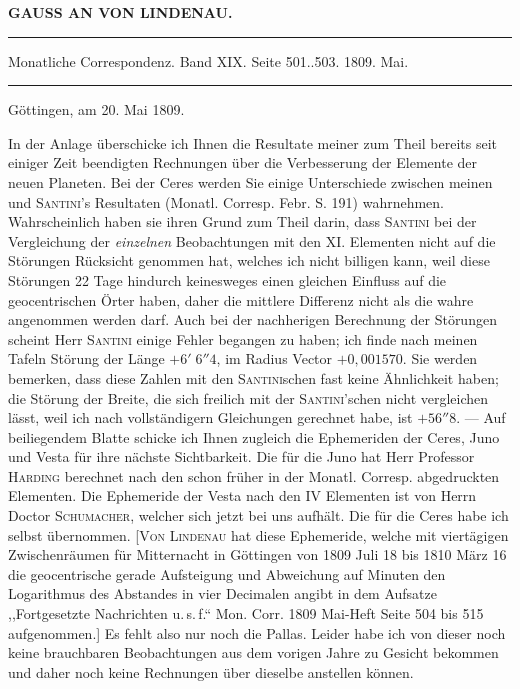 \clearpage
{}
\hypertarget{native-316-lower}{}
\begin{center}
\textbf{GAUSS AN VON LINDENAU.}

\par\vspace{4pt}\hrule\vspace{4pt}
\fontsize{10}{12}\selectfont Monatliche Correspondenz. Band XIX. Seite 501..503. 1809. Mai.
\par\vspace{4pt}\hrule\vspace{4pt}
\end{center}

\begin{flushright}Göttingen, am 20. Mai 1809.\end{flushright}

\par\indent In der Anlage überschicke ich Ihnen die Resultate meiner zum Theil bereits seit einiger Zeit beendigten Rechnungen über die Verbesserung der Elemente der neuen Planeten. Bei der Ceres werden Sie einige Unterschiede zwischen meinen und \textsc{Santini}'s Resultaten (Monatl. Corresp. Febr. S. 191) wahrnehmen. Wahrscheinlich haben sie ihren Grund zum Theil darin, dass \textsc{Santini} bei der Vergleichung der \emph{einzelnen} Beobachtungen mit den XI. Elementen nicht auf die Störungen Rücksicht genommen hat, welches ich nicht billigen kann, weil diese Störungen 22 Tage hindurch keinesweges einen gleichen Einfluss auf die geocentrischen Örter haben, daher die mittlere Differenz nicht als die wahre angenommen werden darf. Auch bei der nachherigen Berechnung der Störungen scheint Herr \textsc{Santini} einige Fehler begangen zu haben; ich finde nach meinen Tafeln Störung der Länge $+6'\;6''4$, im Radius Vector $+0{,}001570$. Sie werden bemerken, dass diese Zahlen mit den \textsc{Santini}schen fast keine Ähnlichkeit haben; die Störung der Breite, die sich freilich mit der \textsc{Santini}'schen nicht vergleichen lässt, weil ich nach vollständigern Gleichungen gerechnet habe, ist $+56''8$. — Auf beiliegendem Blatte schicke ich Ihnen zugleich die Ephemeriden der Ceres, Juno und Vesta für ihre nächste Sichtbarkeit. Die für die Juno hat Herr Professor \textsc{Harding} berechnet nach den schon früher in der Monatl. Corresp. abgedruckten Elementen. Die Ephemeride der Vesta nach den IV Elementen ist von Herrn Doctor \textsc{Schumacher}, welcher sich jetzt bei uns aufhält. Die für die Ceres habe ich selbst übernommen. [\textsc{Von Lindenau} hat diese Ephemeride, welche mit viertägigen Zwischenräumen für Mitternacht in Göttingen von 1809 Juli 18 bis 1810 März 16 die geocentrische gerade Aufsteigung und Abweichung auf Minuten den Logarithmus des Abstandes in vier Decimalen angibt in dem Aufsatze ,,Fortgesetzte Nachrichten u.\,s.\,f.“ Mon. Corr. 1809 Mai-Heft Seite 504 bis 515 aufgenommen.] Es fehlt also nur noch die Pallas. Leider habe ich von dieser noch keine brauchbaren Beobachtungen aus dem vorigen Jahre zu Gesicht bekommen und daher noch keine Rechnungen über dieselbe anstellen können.

